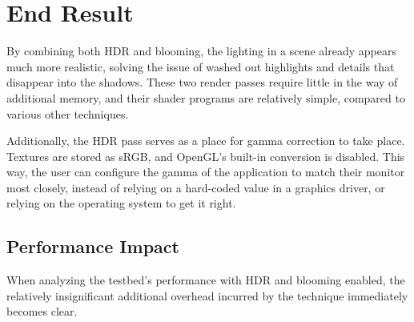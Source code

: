\documentclass[11pt, oneside]{report}
\begin{document}
\section{End Result}
By combining both \gls{HDR} and blooming, the lighting in a scene already appears much more realistic, solving the issue of washed out highlights and details that disappear into the shadows. These two render passes require little in the way of additional memory, and their \gls{shader} programs are relatively simple, compared to various other techniques. 

Additionally, the \gls{HDR} pass serves as a place for gamma correction to take place. Textures are stored as sRGB, and \gls{OpenGL}'s built-in conversion is disabled. This way, the user can configure the gamma of the application to match their monitor most closely, instead of relying on a hard-coded value in a graphics driver, or relying on the operating system to get it right.

\subsection{Performance Impact}
When analyzing the testbed's performance with \gls{HDR} and blooming enabled, the relatively insignificant additional overhead incurred by the technique immediately becomes clear.
\end{document}
